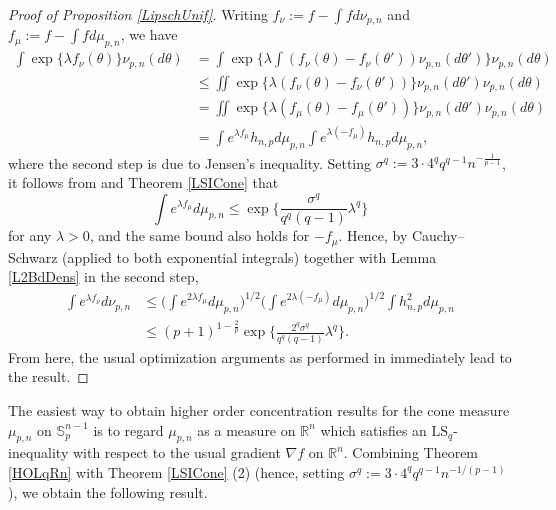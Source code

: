 \documentclass[a4paper,12pt]{amsart}
\numberwithin{equation}{section}
\theoremstyle{remark}
\def\R{{\mathbb R}}
\def\S{{\mathbb S}}
\begin{document}
\begin{proof}[Proof of Proposition \ref{LipschUnif}]
    Writing $f_\nu := f - \int f d\nu_{p,n}$ and $f_\mu := f - \int f d\mu_{p,n}$, we have
    \begin{align*}
        \int \exp\{\lambda f_\nu(\theta)\} \nu_{p,n}(d\theta) &= \int \exp\Big\{\lambda \int (f_\nu(\theta) - f_\nu(\theta')) \nu_{p,n}(d\theta') \Big\} \nu_{p,n}(d\theta)\\
        &\le \iint \exp\{\lambda (f_\nu(\theta) - f_\nu(\theta'))\} \nu_{p,n}(d\theta') \nu_{p,n}(d\theta)\\
        &= \iint \exp\{\lambda (f_\mu(\theta) - f_\mu(\theta'))\} \nu_{p,n}(d\theta') \nu_{p,n}(d\theta)\\
        &= \int e^{\lambda f_\mu} h_{n,p} d\mu_{p,n} \int e^{\lambda (-f_\mu)} h_{n,p} d\mu_{p,n},
    \end{align*}
    where the second step is due to Jensen's inequality. Setting $\sigma^q := 3 \cdot 4^q q^{q-1} n^{-\frac{1}{p-1}}$, it follows from \cite[Eq.\ (1.0.3)]{BZ05} and Theorem \ref{LSICone} that
    \[
    \int e^{\lambda f_\mu} d\mu_{p,n} \le \exp\Big\{ \frac{\sigma^q}{q^q(q-1)} \lambda^q\Big\}
    \]
    for any $\lambda > 0$, and the same bound also holds for $-f_\mu$. Hence, by Cauchy--Schwarz (applied to both exponential integrals) together with Lemma \ref{L2BdDens} in the second step,
    \begin{align*}
        \int e^{\lambda f_\nu} d\nu_{p,n} &\le \Big(\int e^{2\lambda f_\mu} d\mu_{p,n}\Big)^{1/2} \Big(\int e^{2\lambda (-f_\mu)} d\mu_{p,n}\Big)^{1/2} \int h_{n,p}^2 d\mu_{p,n}\\
        &\le (p+1)^{1 - \frac{2}{p}} \exp\Big\{ \frac{2^q\sigma^q}{q^q(q-1)} \lambda^q\Big\}.
    \end{align*}
    From here, the usual optimization arguments as performed in \cite[Th.\ 1.3]{BZ05} immediately lead to the result.
\end{proof}

The easiest way to obtain higher order concentration results for the cone measure $\mu_{p,n}$ on $\S_p^{n-1}$ is to regard $\mu_{p,n}$ as a measure on $\R^n$ which satisfies an $\mathrm{LS}_q$-inequality with respect to the usual gradient $\nabla f$ on $\R^n$. Combining Theorem \ref{HOLqRn} with Theorem \ref{LSICone} (2) (hence, setting $\sigma^q := 3 \cdot 4^q q^{q-1} n^{-1/(p-1)}$), we obtain the following result.
\end{document}

